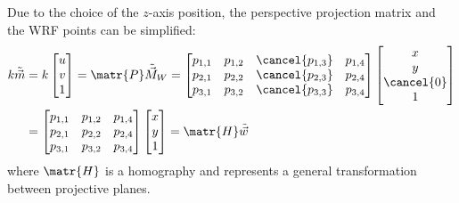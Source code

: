 \begin{description}
        Due to the choice of the $z$-axis position, the perspective projection matrix and the WRF points can be simplified:
        \[ 
            \begin{split}
                k \tilde{\vec{m}} &= 
                k \begin{bmatrix} u \\ v \\ 1 \end{bmatrix} =
                \matr{P} \tilde{\vec{M}}_W =
                \begin{bmatrix}
                    p_{1,1} & p_{1,2} & \cancel{p_{1,3}} & p_{1,4} \\
                    p_{2,1} & p_{2,2} & \cancel{p_{2,3}} & p_{2,4} \\
                    p_{3,1} & p_{3,2} & \cancel{p_{3,3}} & p_{3,4}
                \end{bmatrix}
                \begin{bmatrix} x \\ y \\ \cancel{0} \\ 1 \end{bmatrix} \\
                &= \begin{bmatrix}
                    p_{1,1} & p_{1,2} & p_{1,4} \\
                    p_{2,1} & p_{2,2} & p_{2,4} \\
                    p_{3,1} & p_{3,2} & p_{3,4}
                \end{bmatrix}
                \begin{bmatrix} x \\ y \\ 1 \end{bmatrix} =
                \matr{H}\tilde{\vec{w}}
            \end{split}
        \]
        where $\matr{H}$ is a homography and represents a general transformation between projective planes.


\end{description}

